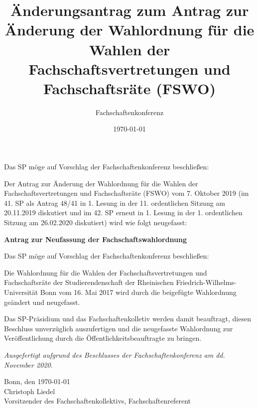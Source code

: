 \documentclass[DIV=12, parskip=half, fontsize=12pt, a4paper]{scrartcl}
\title{Änderungsantrag zum Antrag zur Änderung der Wahlordnung für die Wahlen der Fachschaftsvertretungen und Fachschaftsräte (FSWO)}
\author{Fachschaftenkonferenz}
\date{\today}
\begin{document}
	\maketitle
	Das SP möge auf Vorschlag der Fachschaftenkonferenz beschließen:

	\begin{linenumbers}
		Der Antrag zur Änderung der Wahlordnung für die Wahlen der Fachschaftsvertretungen und Fachschaftsräte (FSWO) vom 7. Oktober 2019 (im 41. SP als Antrag 48/41 in 1. Lesung in der 11. ordentlichen Sitzung am 20.11.2019 diskutiert und im 42. SP erneut in 1. Lesung in der 1. ordentlichen Sitzung am 26.02.2020 diskutiert) wird wie folgt neugefasst:

		\begin{center}\bfseries\LARGE Antrag zur Neufassung der Fachschaftswahlordnung
		\end{center}

		Das SP möge auf Vorschlag der Fachschaftenkonferenz beschließen:

		Die Wahlordnung für die Wahlen der Fachschaftsvertretungen und Fachschaftsräte der Studierendenschaft der Rheinischen Friedrich-Wilhelms-Universität Bonn vom 16. Mai 2017 wird durch die beigefügte Wahlordnung geändert und neugefasst.

		Das  SP-Präsidium und das Fachschaftenkolletiv  werden  damit  beauftragt,  diesen Beschluss unverzüglich auszufertigen und die neugefasste Wahlordnung zur Veröffentlichung durch die Öffentlichkeitsbeauftragte zu bringen.
	\end{linenumbers}

	\vspace{1em}
	\textit{Ausgefertigt aufgrund des Beschlusses der Fachschaftenkonferenz am dd. November 2020.}

	Bonn, den \today \\
	Christoph Liedel \\
	{\scriptsize Vorsitzender des Fachschaftenkollektivs, Fachschaftenreferent}

	\clearpage
	
\end{document}
